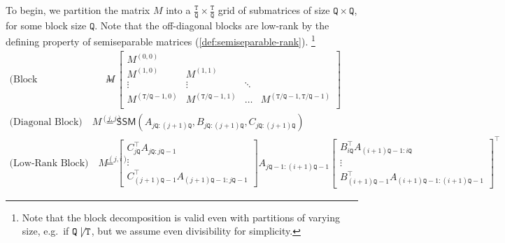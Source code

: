 \documentclass{article}
\begin{document}
To begin, we partition the matrix $M$ into a $\frac{\mathtt{T}}{\mathtt{Q}} \times \frac{\mathtt{T}}{\mathtt{Q}}$ grid of submatrices of size $\mathtt{Q} \times \mathtt{Q}$,
for some block size $\mathtt{Q}$.
Note that the off-diagonal blocks are low-rank by the defining property of semiseparable matrices (\cref{def:semiseparable-rank}).
\footnote{Note that the block decomposition is valid even with partitions of varying size, e.g.\ if $\mathtt{Q} \not\mid \mathtt{T}$, but we assume even divisibility for simplicity.}
\begin{align*}
  \text{(Block Decomposition)} \quad M &=
  \begin{bmatrix}
    M^{(0,0)} \\
    M^{(1,0)} & M^{(1,1)} \\
    \vdots & \vdots & \ddots \\
    M^{(\mathtt{T}/\mathtt{Q}-1,0)} & M^{(\mathtt{T}/\mathtt{Q}-1,1)} & \dots & M^{(\mathtt{T}/\mathtt{Q}-1,\mathtt{T}/\mathtt{Q}-1)} \\
  \end{bmatrix}
  \\
  \text{(Diagonal Block)} \quad M^{(j,j)} &= \mathsf{SSM}(A_{j\mathtt{Q}:(j+1)\mathtt{Q}}, B_{j\mathtt{Q}:(j+1)\mathtt{Q}}, C_{j\mathtt{Q}:(j+1)\mathtt{Q}}) \\
  \text{(Low-Rank Block)} \quad M^{(j,i)} &= 
  \begin{bmatrix}C_{j\mathtt{Q}}^{\top} A_{j\mathtt{Q}:j\mathtt{Q}-1} \\[1pt] \vdots \\[1pt] C_{(j+1)\mathtt{Q}-1}^{\top} A_{(j+1)\mathtt{Q}-1:j\mathtt{Q}-1}\end{bmatrix}
  A_{j\mathtt{Q}-1:(i+1)\mathtt{Q}-1}
  \begin{bmatrix}B_{i\mathtt{Q}}^{\top} A_{(i+1)\mathtt{Q}-1:i\mathtt{Q}} \\[1pt] \vdots \\[1pt] B_{(i+1)\mathtt{Q}-1}^{\top} A_{(i+1)\mathtt{Q}-1:(i+1)\mathtt{Q}-1}\end{bmatrix}^{\top}
\end{align*}
\end{document}
